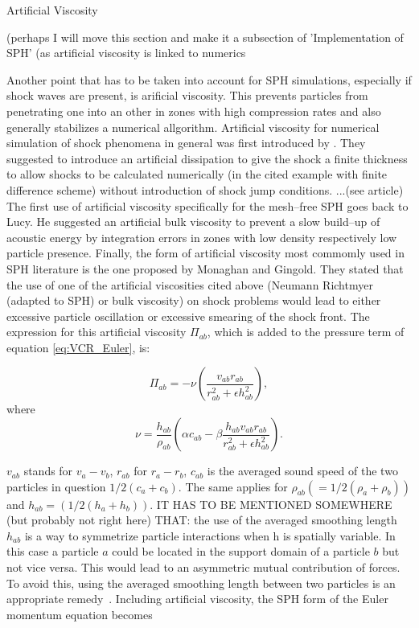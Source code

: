 \documentclass{report}
\begin{document}
Artificial Viscosity

(perhaps I will move this section and make it a subsection of 'Implementation of SPH' (as artificial viscosity is linked to numerics

Another point that has to be taken into account for SPH simulations, especially
if shock waves are present, is arificial viscosity\cite{Monaghan2005}. This
prevents particles from penetrating one into an other in zones with high
compression rates and also generally stabilizes a numerical
allgorithm.
Artificial viscosity for numerical simulation of shock phenomena
in general was first introduced by \cite{vonNeumann1950}. They suggested to
introduce an artificial dissipation to give the shock a finite thickness to 
allow shocks to be calculated numerically (in the cited example with finite difference
scheme) without introduction of shock jump conditions.    ...(see article)
The first use of artificial viscosity specifically for the mesh--free SPH goes
back to Lucy\cite{Lucy1977}. He suggested an artificial bulk viscosity to
prevent a slow build--up of acoustic energy by integration errors in zones with
low density respectively low particle presence. 
Finally, the form of artificial viscosity most commomly used in SPH
literature\cite{Liu2003} is the one proposed by Monaghan and
Gingold\cite{Monaghan1983}. They stated that the use of one of the artificial
viscosities cited above (Neumann Richtmyer (adapted to SPH) or bulk
viscosity) on shock problems would lead to either excessive particle
oscillation or excessive smearing of the shock front. The expression for this
artificial viscosity $\Pi_{ab}$, which is added to the pressure term of
equation \ref{eq:VCR_Euler}, is:

\begin{equation}
\label{eq:MonArtVis}
\Pi _{\mathit{ab}}=-\nu
\left(\frac{v_{\mathit{ab}}r_{\mathit{ab}}}{r_{\mathit{ab}}^{2}+\epsilon
h_{\mathit{ab}}^{2}}\right),
\end{equation}
where 
\begin{equation}
\label{eq:FactArtVis}
\nu =\frac{h_{\mathit{ab}}}{\rho _{\mathit{ab}}}\left(\alpha
c_{\mathit{ab}}-\beta
\frac{h_{\mathit{ab}}v_{\mathit{ab}}r_{\mathit{ab}}}{r_{\mathit{ab}}^{2}+\epsilon
h_{\mathit{ab}}^{2}}\right).
\end{equation}

$v_{ab}$ stands for $v_a-v_b$, $r_{ab}$ for $r_a-r_b$, $c_{ab}$ is the
averaged sound speed of the two particles in question $1/2(c_a+c_b)$. The same
applies for $\rho_{ab}(=1/2(\rho_a+\rho_b))$ and $h_{ab}=(1/2(h_a+h_b))$. IT
HAS TO BE MENTIONED SOMEWHERE (but probably not right here) THAT: the use of
the averaged smoothing length $h_{ab}$ is a way to symmetrize particle
interactions when h is spatially variable. In this case a particle $a$ could be
located in the support domain of a particle $b$ but not vice versa. This would
lead to an asymmetric mutual contribution of forces. To avoid this, using the
averaged smoothing length between two particles is an appropriate remedy~\cite{Liu2003}.
Including artificial viscosity, the SPH form of the Euler momentum equation becomes~\cite{Monaghan2005}
\end{document}
